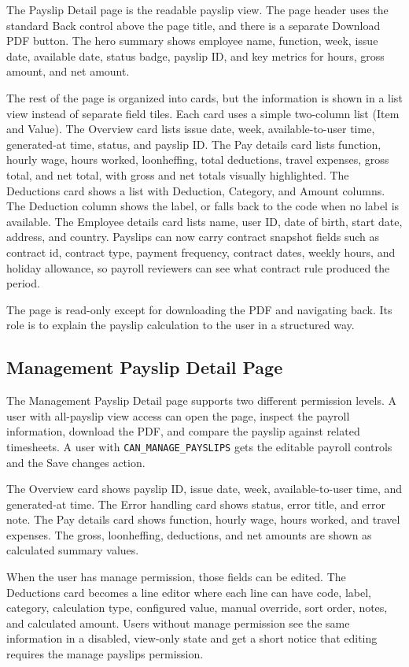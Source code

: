 \documentclass[11pt]{article}
\newcommand{\code}[1]{\nolinkurl{#1}}
\begin{document}
The Payslip Detail page is the readable payslip view. The page header uses the standard Back control above the page title, and there is a separate Download PDF button. The hero summary shows employee name, function, week, issue date, available date, status badge, payslip ID, and key metrics for hours, gross amount, and net amount.

The rest of the page is organized into cards, but the information is shown in a list view instead of separate field tiles. Each card uses a simple two-column list (Item and Value). The Overview card lists issue date, week, available-to-user time, generated-at time, status, and payslip ID. The Pay details card lists function, hourly wage, hours worked, loonheffing, total deductions, travel expenses, gross total, and net total, with gross and net totals visually highlighted. The Deductions card shows a list with Deduction, Category, and Amount columns. The Deduction column shows the label, or falls back to the code when no label is available. The Employee details card lists name, user ID, date of birth, start date, address, and country. Payslips can now carry contract snapshot fields such as contract id, contract type, payment frequency, contract dates, weekly hours, and holiday allowance, so payroll reviewers can see what contract rule produced the period.

The page is read-only except for downloading the PDF and navigating back. Its role is to explain the payslip calculation to the user in a structured way.

\subsection{Management Payslip Detail Page}

The Management Payslip Detail page supports two different permission levels. A user with all-payslip view access can open the page, inspect the payroll information, download the PDF, and compare the payslip against related timesheets. A user with \code{CAN_MANAGE_PAYSLIPS} gets the editable payroll controls and the Save changes action.

The Overview card shows payslip ID, issue date, week, available-to-user time, and generated-at time. The Error handling card shows status, error title, and error note. The Pay details card shows function, hourly wage, hours worked, and travel expenses. The gross, loonheffing, deductions, and net amounts are shown as calculated summary values.

When the user has manage permission, those fields can be edited. The Deductions card becomes a line editor where each line can have code, label, category, calculation type, configured value, manual override, sort order, notes, and calculated amount. Users without manage permission see the same information in a disabled, view-only state and get a short notice that editing requires the manage payslips permission.
\end{document}
